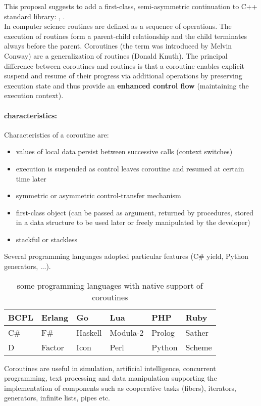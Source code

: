 
This proposal suggests to add a first-class, semi-asymmetric continuation to
C++ standard library: \pullcoro, \pushcoro.\\
\newline
In computer science routines are defined as a sequence of operations. The
execution of routines form a parent-child relationship and the child terminates
always before the parent. Coroutines (the term was introduced by Melvin
Conway\cite{Conway1963}) are a generalization of routines (Donald
Knuth\cite{Knuth1997}). The principal difference between coroutines and routines
is that a coroutine enables explicit suspend and resume of their progress via
additional operations by preserving execution state and thus provide an
{\bf enhanced control flow} (maintaining the execution context).\\

\paragraph*{characteristics:}
Characteristics\cite{Moura2009} of a coroutine are:
\begin{itemize}
    \item values of local data persist between successive calls (context
          switches)
    \item execution is suspended as control leaves coroutine and resumed at
          certain time later
    \item symmetric or asymmetric control-transfer mechanism
    \item first-class object (can be passed as argument, returned by procedures,
          stored in a data structure to be used later or freely manipulated by
          the developer)
    \item stackful or stackless
\end{itemize}

Several programming languages adopted particular features (C\# yield, Python
generators, ...).
\begin{table}[h]
    \centering
    \begin{tabular}{ l l l l l l }
        \midrule
        BCPL    &   Erlang  &   Go      &   Lua         &   PHP     &   Ruby \\
        \midrule
        C\#     &   F\#     &   Haskell &   Modula-2    &   Prolog  &   Sather \\
        \midrule
        D       &   Factor  &   Icon    &   Perl        &   Python  &   Scheme \\
        \midrule
    \end{tabular}
    \caption{some programming languages with native support of coroutines}
\end{table}
\newline
Coroutines are useful in simulation, artificial intelligence, concurrent
programming, text processing and data manipulation\cite{Moura2009} supporting
the implementation of components such as cooperative tasks (fibers), iterators,
generators, infinite lists, pipes etc.

